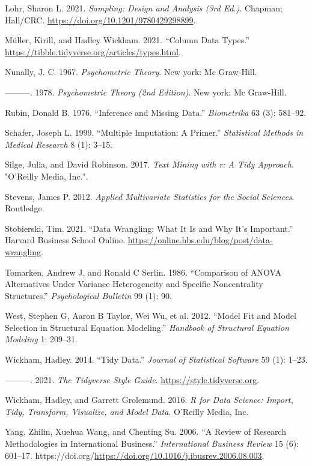 \documentclass[
  letterpaper,
]{krantz}
\newlength{\cslhangindent}
\newenvironment{CSLReferences}[2] %
 {\begin{list}{}{%
  \setlength{\itemindent}{0pt}
  \setlength{\leftmargin}{0pt}
  \setlength{\parsep}{0pt}
  \ifodd #1
   \setlength{\leftmargin}{\cslhangindent}
   \setlength{\itemindent}{-1\cslhangindent}
  \fi
  \setlength{\itemsep}{#2\baselineskip}}}
 {\end{list}}
\begin{document}
\begin{CSLReferences}{1}{0}
Lohr, Sharon L. 2021. \emph{Sampling: Design and Analysis (3rd Ed.)}.
Chapman; Hall/CRC. \url{https://doi.org/10.1201/9780429298899}.

Müller, Kirill, and Hadley Wickham. 2021. {``Column Data Types.''}
\url{https://tibble.tidyverse.org/articles/types.html}.

Nunally, J. C. 1967. \emph{Psychometric Theory}. New york: Mc Graw-Hill.

---------. 1978. \emph{Psychometric Theory (2nd Edition)}. New york: Mc
Graw-Hill.

Rubin, Donald B. 1976. {``Inference and Missing Data.''}
\emph{Biometrika} 63 (3): 581--92.

Schafer, Joseph L. 1999. {``Multiple Imputation: A Primer.''}
\emph{Statistical Methods in Medical Research} 8 (1): 3--15.

Silge, Julia, and David Robinson. 2017. \emph{Text Mining with r: A Tidy
Approach}. "O'Reilly Media, Inc.".

Stevens, James P. 2012. \emph{Applied Multivariate Statistics for the
Social Sciences}. Routledge.

Stobierski, Tim. 2021. {``Data Wrangling: What It Is and Why It's
Important.''} Harvard Business School Online.
\url{https://online.hbs.edu/blog/post/data-wrangling}.

Tomarken, Andrew J, and Ronald C Serlin. 1986. {``Comparison of ANOVA
Alternatives Under Variance Heterogeneity and Specific Noncentrality
Structures.''} \emph{Psychological Bulletin} 99 (1): 90.

West, Stephen G, Aaron B Taylor, Wei Wu, et al. 2012. {``Model Fit and
Model Selection in Structural Equation Modeling.''} \emph{Handbook of
Structural Equation Modeling} 1: 209--31.

Wickham, Hadley. 2014. {``Tidy Data.''} \emph{Journal of Statistical
Software} 59 (1): 1--23.

---------. 2021. \emph{The Tidyverse Style Guide}.
\url{https://style.tidyverse.org}.

Wickham, Hadley, and Garrett Grolemund. 2016. \emph{R for Data Science:
Import, Tidy, Transform, Visualize, and Model Data}. {O'Reilly Media,
Inc.}

Yang, Zhilin, Xuehua Wang, and Chenting Su. 2006. {``A Review of
Research Methodologies in International Business.''} \emph{International
Business Review} 15 (6): 601--17.
https://doi.org/\url{https://doi.org/10.1016/j.ibusrev.2006.08.003}.

\end{CSLReferences}



\backmatter
\printindex
\end{document}
